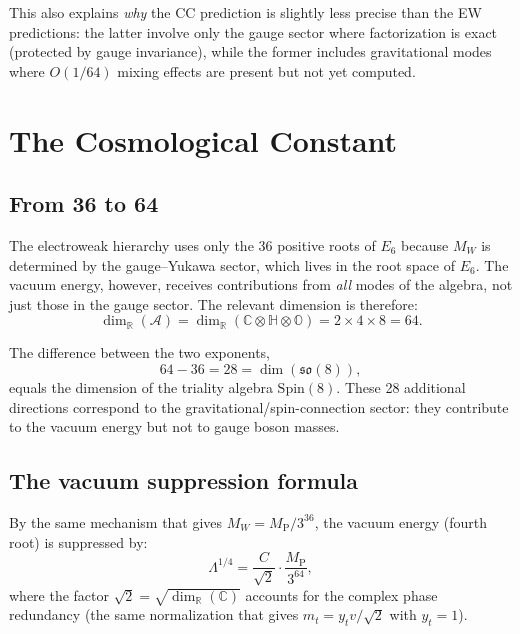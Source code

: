 \documentclass[12pt,a4paper]{article}
\theoremstyle{definition}
\theoremstyle{remark}
\newcommand{\Oct}{\mathbb{O}}
\newcommand{\Quat}{\mathbb{H}}
\newcommand{\Comp}{\mathbb{C}}
\newcommand{\Real}{\mathbb{R}}
\newcommand{\Alg}{\mathcal{A}}
\newcommand{\Spin}{\mathrm{Spin}}
\newcommand{\MP}{M_{\mathrm{P}}}
\begin{document}
This also explains \emph{why} the CC prediction is slightly less precise than 
the EW predictions: the latter involve only the gauge sector where 
factorization is exact (protected by gauge invariance), while the former 
includes gravitational modes where $O(1/64)$ mixing effects are present 
but not yet computed.

\section{The Cosmological Constant}
\label{sec:cc}

\subsection{From 36 to 64}

The electroweak hierarchy uses only the 36 positive roots of $E_6$ because 
$M_W$ is determined by the gauge--Yukawa sector, which lives in the 
root space of $E_6$. The vacuum energy, however, receives contributions 
from \emph{all} modes of the algebra, not just those in the gauge sector. 
The relevant dimension is therefore:
\begin{equation}
\dim_\Real(\Alg) = \dim_\Real(\Comp\otimes\Quat\otimes\Oct) 
= 2 \times 4 \times 8 = 64.
\end{equation}

The difference between the two exponents,
\begin{equation}
64 - 36 = 28 = \dim(\mathfrak{so}(8)),
\end{equation}
equals the dimension of the triality algebra $\Spin(8)$. These 28 additional 
directions correspond to the gravitational/spin-connection sector: they 
contribute to the vacuum energy but not to gauge boson masses.

\subsection{The vacuum suppression formula}

By the same mechanism that gives $M_W = \MP/3^{36}$, the vacuum energy 
(fourth root) is suppressed by:
\begin{equation}
\Lambda^{1/4} = \frac{C}{\sqrt{2}} \cdot \frac{\MP}{3^{64}},
\label{eq:cc_raw}
\end{equation}
where the factor $\sqrt{2} = \sqrt{\dim_\Real(\Comp)}$ accounts for the 
complex phase redundancy (the same normalization that gives 
$m_t = y_t v/\sqrt{2}$ with $y_t = 1$).
\end{document}

